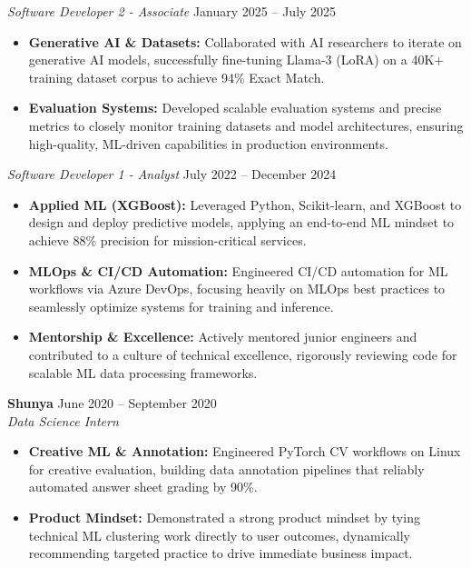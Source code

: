 \documentclass[11pt,a4paper]{article}
\begin{document}
\vspace{3pt}
\noindent
\textit{Software Developer 2 - Associate} \hfill January 2025 -- July 2025
\begin{itemize}[leftmargin=*,noitemsep,topsep=0pt]
    \item \textbf{Generative AI \& Datasets:} Collaborated with AI researchers to iterate on generative AI models, successfully fine-tuning Llama-3 (LoRA) on a 40K+ training dataset corpus to achieve 94\% Exact Match.
    \item \textbf{Evaluation Systems:} Developed scalable evaluation systems and precise metrics to closely monitor training datasets and model architectures, ensuring high-quality, ML-driven capabilities in production environments.
\end{itemize}

\vspace{3pt}
\noindent
\textit{Software Developer 1 - Analyst} \hfill July 2022 -- December 2024
\begin{itemize}[leftmargin=*,noitemsep,topsep=0pt]
    \item \textbf{Applied ML (XGBoost):} Leveraged Python, Scikit-learn, and XGBoost to design and deploy predictive models, applying an end-to-end ML mindset to achieve 88\% precision for mission-critical services.
    \item \textbf{MLOps \& CI/CD Automation:} Engineered CI/CD automation for ML workflows via Azure DevOps, focusing heavily on MLOps best practices to seamlessly optimize systems for training and inference.
    \item \textbf{Mentorship \& Excellence:} Actively mentored junior engineers and contributed to a culture of technical excellence, rigorously reviewing code for scalable ML data processing frameworks.
\end{itemize}

\vspace{3pt}
\noindent
\textbf{Shunya} \hfill June 2020 -- September 2020 \\
\textit{Data Science Intern}
\begin{itemize}[leftmargin=*,noitemsep,topsep=0pt]
    \item \textbf{Creative ML \& Annotation:} Engineered PyTorch CV workflows on Linux for creative evaluation, building data annotation pipelines that reliably automated answer sheet grading by 90\%.
    \item \textbf{Product Mindset:} Demonstrated a strong product mindset by tying technical ML clustering work directly to user outcomes, dynamically recommending targeted practice to drive immediate business impact.
\end{itemize}
\end{document}

